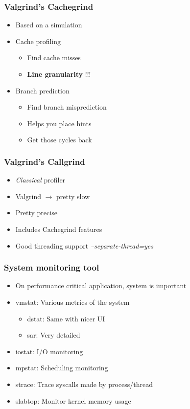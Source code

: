 \begin{frame}
  \frametitle{Valgrind's Cachegrind}

  \begin{itemize}
  \item Based on a simulation
  \item Cache profiling
    \begin{itemize}
    \item Find cache misses
    \item \textbf{Line granularity} !!!
    \end{itemize}
  \item Branch prediction
    \begin{itemize}
    \item Find branch misprediction
    \item Helps you place hints
    \item Get those cycles back
    \end{itemize}
  \end{itemize}
\end{frame}


\begin{frame}
  \frametitle{Valgrind's Callgrind}

  \begin{itemize}
  \item \emph{Classical} profiler
  \item Valgrind $\rightarrow$ pretty slow
  \item Pretty precise
  \item Includes Cachegrind features
  \item Good threading support \emph{--separate-thread=yes}
  \end{itemize}
\end{frame}


\begin{frame}
  \frametitle{System monitoring tool}

  \begin{itemize}
  \item On performance critical application, system is important
  \item vmstat: Various metrics of the system
    \begin{itemize}
    \item dstat: Same with nicer UI
    \item sar: Very detailed
    \end{itemize}
  \item iostat: I/O monitoring
  \item mpstat: Scheduling monitoring
  \item strace: Trace syscalls made by process/thread
  \item slabtop: Monitor kernel memory usage
  \end{itemize}
\end{frame}


